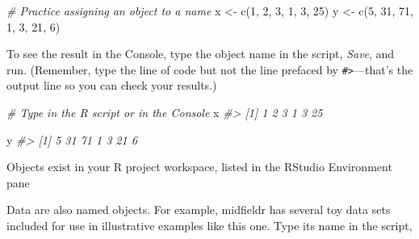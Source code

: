 \documentclass[
]{book}
\newenvironment{Shaded}{\begin{snugshade}}{\end{snugshade}}
\newcommand{\CommentTok}[1]{\textcolor[rgb]{0.56,0.35,0.01}{\textit{#1}}}
\newcommand{\DecValTok}[1]{\textcolor[rgb]{0.00,0.00,0.81}{#1}}
\newcommand{\FunctionTok}[1]{\textcolor[rgb]{0.00,0.00,0.00}{#1}}
\newcommand{\NormalTok}[1]{#1}
\newcommand{\OtherTok}[1]{\textcolor[rgb]{0.56,0.35,0.01}{#1}}
\begin{document}
\begin{Shaded}
\begin{Highlighting}[]
\CommentTok{\# Practice assigning an object to a name}
\NormalTok{x }\OtherTok{\textless{}{-}} \FunctionTok{c}\NormalTok{(}\DecValTok{1}\NormalTok{, }\DecValTok{2}\NormalTok{, }\DecValTok{3}\NormalTok{, }\DecValTok{1}\NormalTok{, }\DecValTok{3}\NormalTok{, }\DecValTok{25}\NormalTok{)}
\NormalTok{y }\OtherTok{\textless{}{-}} \FunctionTok{c}\NormalTok{(}\DecValTok{5}\NormalTok{, }\DecValTok{31}\NormalTok{, }\DecValTok{71}\NormalTok{, }\DecValTok{1}\NormalTok{, }\DecValTok{3}\NormalTok{, }\DecValTok{21}\NormalTok{, }\DecValTok{6}\NormalTok{)}
\end{Highlighting}
\end{Shaded}

To see the result in the Console, type the object name in the script, \emph{Save}, and run. (Remember, type the line of code but not the line prefaced by \texttt{\#\textgreater{}}---that's the output line so you can check your results.)

\begin{Shaded}
\begin{Highlighting}[]
\CommentTok{\# Type in the R script or in the Console}
\NormalTok{x}
\CommentTok{\#\textgreater{} [1]  1  2  3  1  3 25}

\NormalTok{y}
\CommentTok{\#\textgreater{} [1]  5 31 71  1  3 21  6}
\end{Highlighting}
\end{Shaded}

Objects exist in your R project workspace, listed in the RStudio Environment pane

Data are also named objects. For example, midfieldr has several toy data sets included for use in illustrative examples like this one. Type its name in the script,
\end{document}
